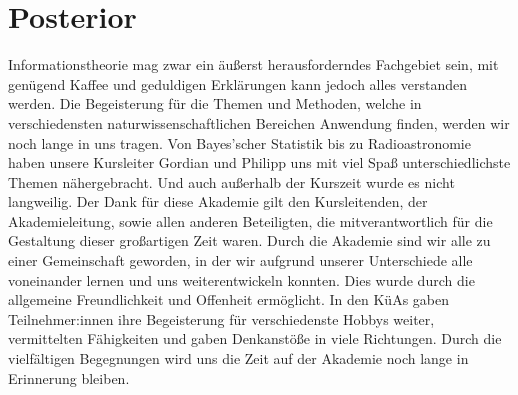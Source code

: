 \section{Posterior}

Informationstheorie mag zwar ein äußerst herausforderndes Fachgebiet sein, mit genügend Kaffee und geduldigen Erklärungen kann jedoch alles verstanden werden. Die Begeisterung für die Themen und Methoden, welche in verschiedensten naturwissenschaftlichen Bereichen Anwendung finden, werden wir noch lange in uns tragen. Von Bayes’scher Statistik bis zu Radioastronomie haben unsere Kursleiter Gordian und Philipp uns mit viel Spaß unterschiedlichste Themen nähergebracht. Und auch außerhalb der Kurszeit wurde es nicht langweilig. Der Dank für diese Akademie gilt den Kursleitenden, der Akademieleitung, sowie allen anderen Beteiligten, die mitverantwortlich für die Gestaltung dieser großartigen Zeit waren. Durch die Akademie sind wir alle zu einer Gemeinschaft geworden, in der wir aufgrund unserer Unterschiede alle voneinander lernen und uns weiterentwickeln konnten. Dies wurde durch die allgemeine Freundlichkeit und Offenheit ermöglicht. In den KüAs gaben Teilnehmer:innen ihre Begeisterung für verschiedenste Hobbys weiter, vermittelten Fähigkeiten und gaben Denkanstöße in viele Richtungen. Durch die vielfältigen Begegnungen wird uns die Zeit auf der Akademie noch lange in Erinnerung bleiben. 
